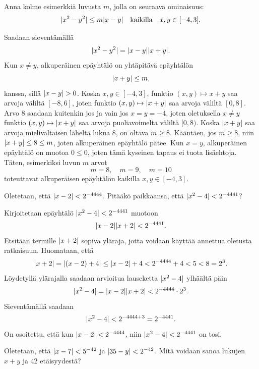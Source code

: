 \documentclass[11pt,a4paper]{amsart}
\begin{document}
\begin{exercise}
Anna kolme esimerkkiä luvusta \(m\), jolla on seuraava ominaisuus:
\begin{equation*}
\lvert x^2 - y^2\rvert \leq m\lvert x - y\rvert \quad \text{kaikilla} \quad x,y \in [-4, 3].
\end{equation*}
\end{exercise}

\begin{solution}
Saadaan sieventämällä
\[\lvert x^2 - y^2\rvert = \lvert x - y\rvert\lvert x + y\rvert.\]
Kun \(x \neq y\), alkuperäinen epäyhtälö on yhtäpitävä epäyhtälön
\[\lvert x + y\rvert \leq m,\]
kanssa, sillä \(\lvert x - y\rvert > 0\). Koska \(x,y \in [-4,
3]\), funktio \((x, y) \mapsto x + y\)
saa arvoja väliltä \([-8, 6]\), joten funktio
\((x, y) \mapsto \lvert x + y\rvert\) saa arvoja väliltä \([0, 8]\). Arvo \(8\)
saadaan kuitenkin jos ja vain jos \(x = y = -4\), joten oletuksella
\(x \neq y\) funktio \((x, y) \mapsto \lvert x + y\rvert\) saa arvoja puoliavoimelta
väliltä \([0, 8)\). Koska \(\lvert x + y\rvert\) saa arvoja mielivaltaisen läheltä
lukua 8, on oltava \(m \geq 8\).
Kääntäen, jos \(m \geq 8\), niin \(\lvert x + y\rvert \leq 8 \leq m\), joten
alkuperäinen epäyhtälö pätee. Kun \(x = y\), alkuperäinen epäyhtälö
on muotoa \(0 \leq 0\), joten tämä kyseinen tapaus ei tuota lisäehtoja.
Täten, esimerkiksi luvun \(m\) arvot \[m = 8, \quad m = 9, \quad m = 10\]
toteuttavat alkuperäisen epäyhtälön kaikilla \(x,y \in [-4, 3]\).
\end{solution}

\begin{exercise}
Oletetaan, että \(\lvert x - 2\rvert < 2^{-4444}\). Pitääkö paikkaansa, että
\(\lvert x^2 - 4\rvert < 2^{-4441}\)?
\end{exercise}

\begin{solution}
Kirjoitetaan epäyhtälö \(\lvert x^2 - 4\rvert < 2^{-4441}\) muotoon
\[\lvert x - 2\rvert\lvert x + 2\rvert < 2^{-4441}.\]
Etsitään termille \(\lvert x + 2\rvert\) sopiva yläraja, jotta voidaan käyttää
annettua oletusta ratkaisuun. Huomataan, että
\[\lvert x + 2\rvert = \lvert(x - 2) + 4\rvert \leq \lvert x - 2\rvert + 4 < 2^{-4444}
+ 4 < 5 < 8 = 2^3.\]
Löydetyllä ylärajalla saadaan arvioitua lauseketta \(\lvert x^2 - 4\rvert\)
ylhäältä päin
\[\lvert x^2 - 4\rvert = \lvert x - 2\rvert\lvert x + 2\rvert < 2^{-4444} \cdot 2^3.\]
Sieventämällä saadaan
\[\lvert x^2 - 4\rvert < 2^{-4444 + 3} = 2^{-4441}.\]
On osoitettu, että kun \(\lvert x - 2\rvert < 2^{-4444}\), niin
\(\lvert x^2 - 4\rvert < 2^{-4441}\) on tosi.
\end{solution}

\begin{exercise}
Oletetaan, että \(\lvert x - 7\rvert < 5^{-42}\) ja \(\lvert35 - y\rvert < 2^{-42}\).
Mitä voidaan sanoa lukujen \(x + y\) ja \(42\) etäisyydestä?
\end{exercise}
\end{document}
